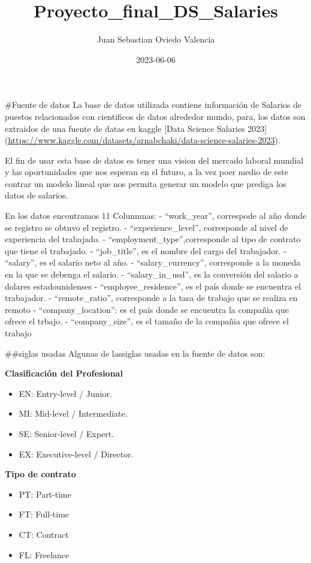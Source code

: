 \documentclass[
]{article}
\title{Proyecto\_final\_DS\_Salaries}
\author{Juan Sebastian Oviedo Valencia}
\date{2023-06-06}
\providecommand{\tightlist}{%
  \setlength{\itemsep}{0pt}\setlength{\parskip}{0pt}}
\begin{document}
\maketitle

\#Fuente de datos La base de datos utilizada contiene información de
Salarios de puestos relacionados con cientificos de datos alrededor
mundo, para, los datos son extraidos de una fuente de datas en kaggle
{[}Data Science Salaries 2023{]}
(\url{https://www.kaggle.com/datasets/arnabchaki/data-science-salaries-2023}).

El fin de usar esta base de datos es tener una vision del mercado
laboral mundial y las oportunidades que nos esperan en el futuro, a la
vez poer medio de este contrar un modelo lineal que nos permita generar
un modelo que prediga los datos de salarios.

En los datos encontramos 11 Colunmnas: - ``work\_year'', correspode al
año donde se registro se obtuvo el registro. - ``experience\_level'',
corresponde al nivel de experiencia del trabajado. -
``employment\_type'',corresponde al tipo de contrato que tiene el
trabajado. - ``job\_title'', es el nombre del cargo del trabajador. -
``salary'', es el salario neto al año. - ``salary\_currency'',
corresponde a la moneda en la que se debenga el salario. -
``salary\_in\_usd'', es la conversión del salario a dolares
estadounidenses - ``employee\_residence'', es el país donde se encuentra
el trabajador. - ``remote\_ratio'', corresponde a la tasa de trabajo que
se realiza en remoto - ``company\_location'': es el país donde se
encuentra la compañia que ofrece el trbajo. - ``company\_size'', es el
tamaño de la compañia que ofrece el trabajo

\#\#siglas usadas Algunas de lassiglas usadas en la fuente de datos son:

\textbf{Clasificación del Profesional}

\begin{itemize}
\tightlist
\item
  EN: Entry-level / Junior.
\item
  MI: Mid-level / Intermediate.
\item
  SE: Senior-level / Expert.
\item
  EX: Executive-level / Director.
\end{itemize}

\textbf{Tipo de contrato}

\begin{itemize}
\tightlist
\item
  PT: Part-time
\item
  FT: Full-time
\item
  CT: Contract
\item
  FL: Freelance
\end{itemize}
\end{document}

